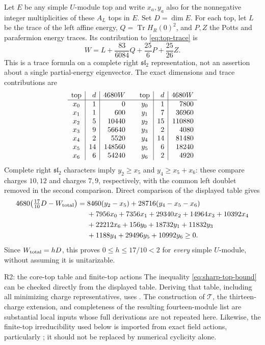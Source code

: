 Let $E$ be any simple $U$-module top and write $x_a,y_a$ also for the
nonnegative integer multiplicities of these $A_L$ tops in $E$.
Set $D=\dim E$. For each top, let $L$ be the trace of the left affine
energy, $Q=\operatorname{Tr}H_R(0)^2$, and $P,Z$ the Potts and
parafermion energy traces. Its contribution to \eqref{eq:top-trace} is
\begin{equation}
 W=L+\frac{83}{6084}Q+\frac{25}{6}P+\frac{25}{26}Z.
 \label{eq:top-W}
\end{equation}
This is a trace formula on a complete right $\mathfrak{sl}_2$
representation, not an assertion about a single partial-energy
eigenvector. The exact dimensions and trace contributions are
\[
\begin{array}{c|r|r@{\qquad}c|r|r}
 \text{top}&d&4680W&\text{top}&d&4680W\\\hline
 x_0&1&0&y_0&1&7800\\
 x_1&1&600&y_1&7&36960\\
 x_2&5&10440&y_2&15&110880\\
 x_3&9&56640&y_3&2&4080\\
 x_4&2&5520&y_4&14&81480\\
 x_5&14&148560&y_5&6&18240\\
 x_6&6&54240&y_6&2&4920
\end{array}
\]
Complete right $\mathfrak{sl}_2$ characters imply
$y_2\ge x_5$ and $y_4\ge x_5+x_6$: these compare charges $10,12$
and charges $7,9$, respectively, with the common left doublet removed
in the second comparison. Direct comparison of the displayed table gives
\begin{align}
 4680\bigl(\tfrac{17}{10}D-W_{\rm total}\bigr)
 ={}&8460(y_2-x_5)+28716(y_4-x_5-x_6)\notag\\
 &+7956x_0+7356x_1+29340x_2+14964x_3+10392x_4\notag\\
 &+22212x_6+156y_0+18732y_1+11832y_3\notag\\
 &+1188y_4+29496y_5+10992y_6\ge0.
 \label{eq:sharp-top-bound}
\end{align}
Since $W_{\rm total}=hD$, this proves $0\le h\le17/10<2$ for
\emph{every} simple $U$-module, without assuming it is unitarizable.

\begin{reviewnote}{R2: the core-top table and finite-top actions}
The inequality \eqref{eq:sharp-top-bound} can be checked directly from
the displayed table. Deriving that table, including all minimizing
charge representatives, uses
.
The construction of $\mathcal T$, the thirteen-charge extension, and
completeness of the resulting fourteen-module list are substantial
local inputs whose full derivations are not repeated here. Likewise,
the finite-top irreducibility used below is imported from exact field
actions, particularly
; it should not be replaced
by numerical cyclicity alone.
\end{reviewnote}

